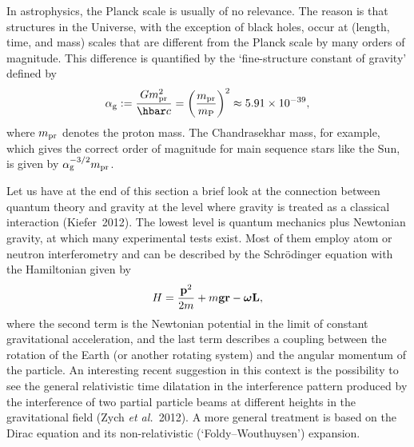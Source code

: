 \documentclass[12pt]{article}
\newcommand{\be}{\begin{equation}}
\newcommand{\ee}{\end{equation}}
\newcommand{\lb}{\label}
\begin{document}
In astrophysics, the Planck scale is usually of no relevance. The
reason is that structures in the Universe, with the exception of black
holes, occur at (length, time, and mass) scales that are different
from the Planck scale by many orders of magnitude. 
This difference is quantified by the `fine-structure constant of
gravity' defined by
\be
\alpha_{\rm g}:= \frac{Gm_{\rm pr}^2}{\hbar c}=
\left(\frac{m_{\rm pr}}{m_{\rm P}}\right)^2 \approx 5.91\times 10^{-39} ,
\lb{alphag}
\ee
where $m_{\rm pr}$ denotes the proton mass. The Chandrasekhar mass,
for example, which gives the correct order of magnitude for main
sequence stars like the Sun, is given by $\alpha_{\rm g}^{-3/2}m_{\rm
  pr}$. 

Let us have at the end of this section a brief look at the connection
between quantum theory and gravity at the level where gravity is
treated as a classical interaction (Kiefer~2012). The lowest level is 
quantum mechanics plus Newtonian gravity, at which many experimental
tests exist. 
Most of them employ atom or neutron interferometry and
can be described by the Schr\"odinger equation with the
Hamiltonian given by
\be
H=\frac{{\mathbf p}^2}{2m} +m{\mathbf g}{\mathbf r}-
 \mbox{\boldmath$\omega$}{\mathbf L} ,
\lb{HCOW}
\ee
where the second term is the Newtonian potential in the limit of
constant gravitational acceleration, and the last term describes a
coupling between the rotation of the Earth (or another rotating
system) and the angular momentum of the particle. 
An interesting recent suggestion in this context is the possibility to
see the general relativistic time dilatation in the interference
pattern produced by the interference of two partial particle beams at
different heights in the gravitational field
(Zych {\em et al.}~2012). A more general treatment is based on the
Dirac equation and its non-relativistic (`Foldy--Wouthuysen') expansion.
\end{document}

